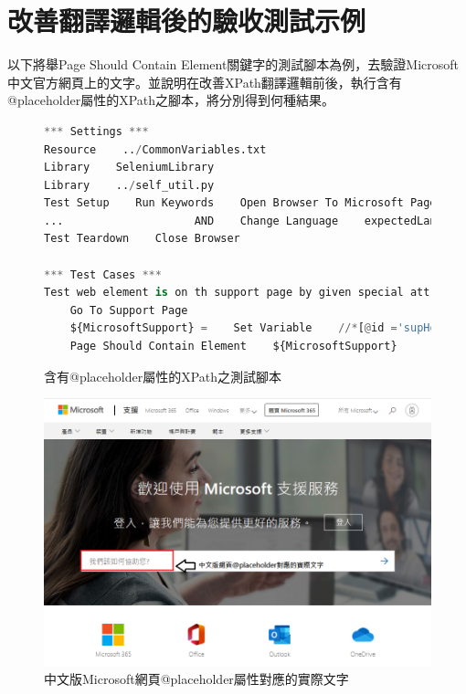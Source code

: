 \section{改善翻譯邏輯後的驗收測試示例}
以下將舉Page Should Contain Element關鍵字的測試腳本為例，去驗證Microsoft中文官方網頁上的文字。並說明在改善XPath翻譯邏輯前後，執行含有@placeholder屬性的XPath之腳本，將分別得到何種結果。

\begin{figure}[H]
\begin{lstlisting}[language={python}]
*** Settings ***
Resource    ../CommonVariables.txt
Library    SeleniumLibrary
Library    ../self_util.py
Test Setup    Run Keywords    Open Browser To Microsoft Page
...                    AND    Change Language    expectedLanguage=${language}
Test Teardown    Close Browser

*** Test Cases ***
Test web element is on th support page by given special attributes
    Go To Support Page
    ${MicrosoftSupport} =    Set Variable    //*[@id ='supHomeAndLandingPageSearchBox' and @placeholder ='How can we help you?']
    Page Should Contain Element    ${MicrosoftSupport}
\end{lstlisting}
\caption{含有@placeholder屬性的XPath之測試腳本}
\end{figure}

\begin{figure}[H]
\includegraphics[width= \textwidth]{../論文截圖/4-2-2 畫面上@placeholder的實際文字.png}
\caption{中文版Microsoft網頁@placeholder屬性對應的實際文字}
\end{figure}

